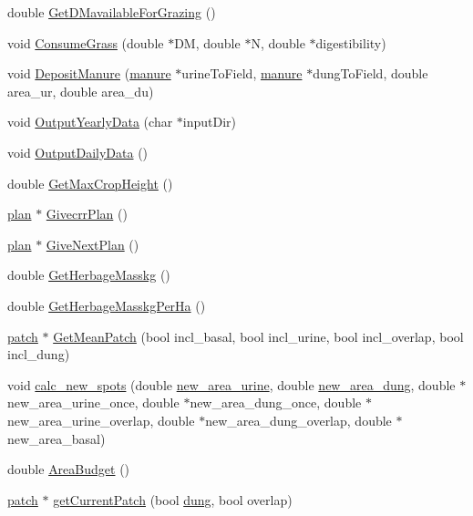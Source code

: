 \begin{DoxyCompactItemize}
\item 
double \hyperlink{classfield_a4eeb65d29ddebdbfb177cd338c12bc3b}{GetDMavailableForGrazing} ()
\item 
void \hyperlink{classfield_aec7bb755e251aa39a8469e57131dd183}{ConsumeGrass} (double $\ast$DM, double $\ast$N, double $\ast$digestibility)
\item 
void \hyperlink{classfield_a5b62b48e403a06c3728b246265b7fb57}{DepositManure} (\hyperlink{classmanure}{manure} $\ast$urineToField, \hyperlink{classmanure}{manure} $\ast$dungToField, double area\_\-ur, double area\_\-du)
\item 
void \hyperlink{classfield_a3839d27d6bdd8eb8c613c14bbea80e82}{OutputYearlyData} (char $\ast$inputDir)
\item 
void \hyperlink{classfield_a82c55e295edd95a5de179d29cb77b231}{OutputDailyData} ()
\item 
double \hyperlink{classfield_a486e5f6dd9eba623677d0442dbf57926}{GetMaxCropHeight} ()
\item 
\hyperlink{classplan}{plan} $\ast$ \hyperlink{classfield_a83310dd2f0b81ec3178627f285e7535a}{GivecrrPlan} ()
\item 
\hyperlink{classplan}{plan} $\ast$ \hyperlink{classfield_a25fdbd15094af59bac804070622daf40}{GiveNextPlan} ()
\item 
double \hyperlink{classfield_ad5e1460e730daa874bb7b0fced8ebb5a}{GetHerbageMasskg} ()
\item 
double \hyperlink{classfield_aedfd65c34ae6b67acbd5cdfb2e5d1a9e}{GetHerbageMasskgPerHa} ()
\item 
\hyperlink{classpatch}{patch} $\ast$ \hyperlink{classfield_a45e0e46b4d636c8f903dd50ca1927b02}{GetMeanPatch} (bool incl\_\-basal, bool incl\_\-urine, bool incl\_\-overlap, bool incl\_\-dung)
\item 
void \hyperlink{classfield_abc9f4e1d63c6f056029895d84884e07c}{calc\_\-new\_\-spots} (double \hyperlink{classfield_a1403303f06e0e2d83fc68543bea2f2ed}{new\_\-area\_\-urine}, double \hyperlink{classfield_a1183441459b4c65b13dfaf43001bf892}{new\_\-area\_\-dung}, double $\ast$new\_\-area\_\-urine\_\-once, double $\ast$new\_\-area\_\-dung\_\-once, double $\ast$new\_\-area\_\-urine\_\-overlap, double $\ast$new\_\-area\_\-dung\_\-overlap, double $\ast$new\_\-area\_\-basal)
\item 
double \hyperlink{classfield_a9c97c30d1b4b2a53e13de987c674cf29}{AreaBudget} ()
\item 
\hyperlink{classpatch}{patch} $\ast$ \hyperlink{classfield_a1fe57d3640a5edae2ab2375a18044853}{getCurrentPatch} (bool \hyperlink{classfield_a70a2a287278fc7614895337ecebd75ea}{dung}, bool overlap)

\end{DoxyCompactItemize}
